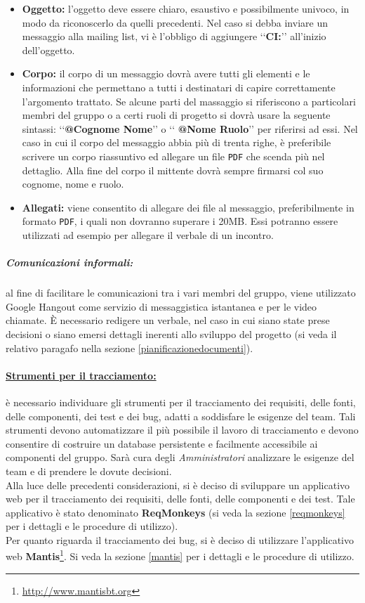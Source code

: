 \begin{itemize}
\item \textbf{Oggetto:} l'oggetto deve essere chiaro, esaustivo e possibilmente univoco, in modo da riconoscerlo da quelli precedenti. Nel caso si debba inviare un messaggio alla mailing list\g{}, vi è l'obbligo di aggiungere \lq\lq\textbf{CI:}\rq\rq{} all'inizio dell'oggetto.

\item \textbf{Corpo:} il corpo di un messaggio dovrà avere tutti gli elementi e le informazioni che permettano a tutti i destinatari di capire correttamente l'argomento trattato. Se alcune parti del massaggio si riferiscono a particolari membri del gruppo o a certi ruoli di progetto si dovrà usare la seguente sintassi: \lq\lq{}\textbf{@Cognome Nome}\rq\rq{} o \lq\lq{} \textbf{@Nome Ruolo}\rq\rq{} per riferirsi ad essi.
Nel caso in cui il corpo del messaggio abbia più di trenta righe, è preferibile scrivere un corpo riassuntivo ed allegare un file \verb!PDF!\g{} che scenda più nel dettaglio. Alla fine del corpo il mittente dovrà sempre firmarsi col suo cognome, nome e ruolo.

\item \textbf{Allegati:} viene consentito di allegare dei file al messaggio, preferibilmente in formato \verb!PDF!\g{}, i quali non dovranno superare i 20MB. Essi potranno essere utilizzati ad esempio per allegare il verbale di un incontro.
\end{itemize}

\subparagraph{Comunicazioni informali:} al fine di facilitare le comunicazioni tra i vari membri del gruppo, viene utilizzato Google Hangout\g{} come servizio di messaggistica istantanea e per le video chiamate. È necessario redigere un verbale, nel caso in cui siano state prese decisioni o siano emersi dettagli inerenti allo sviluppo del progetto (si veda il relativo paragafo nella sezione \ref{pianificazionedocumenti}).

\paragraph{\underline{Strumenti per il tracciamento:}} è necessario individuare gli strumenti per il tracciamento dei requisiti, delle fonti, delle componenti, dei test e dei bug, adatti a soddisfare le esigenze del team. Tali strumenti devono automatizzare il più possibile il lavoro di tracciamento e devono consentire di costruire un database persistente e facilmente accessibile ai componenti del gruppo. Sarà cura degli \textit{Amministratori} analizzare le esigenze del team e di prendere le dovute decisioni.\\
Alla luce delle precedenti considerazioni, si è deciso di sviluppare un applicativo web per il tracciamento dei requisiti, delle fonti, delle componenti e dei test. Tale applicativo è stato denominato \textbf{ReqMonkeys} (si veda la sezione \ref{reqmonkeys} per i dettagli e le procedure di utilizzo).\\
Per quanto riguarda il tracciamento dei bug, si è deciso di utilizzare l'applicativo web \textbf{Mantis}\footnote{\url{http://www.mantisbt.org}}. Si veda la sezione \ref{mantis} per i dettagli e le procedure di utilizzo.

